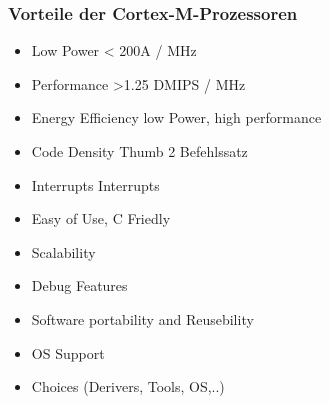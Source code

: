\subsubsection{Vorteile der Cortex-M-Prozessoren}
\begin{itemize}
    \item Low Power
        \subitem < 200\mu A / MHz
    \item Performance
        \subitem >1.25 DMIPS / MHz
    \item Energy Efficiency
        \subitem low Power, high performance
    \item Code Density
        \subitem Thumb 2 Befehlssatz
    \item Interrupts
         Interrupts
    \item Easy of Use, C Friedly
    \item Scalability
    \item Debug Features
    \item Software portability and Reusebility
    \item OS Support
    \item Choices (Derivers, Tools, OS,..)    
\end{itemize}






















